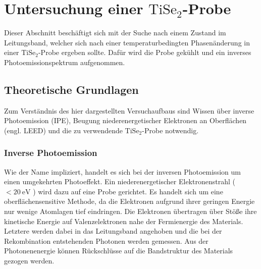\clearpage
\section{\texorpdfstring{Untersuchung einer $\text{TiSe}_2$-Probe}{Untersuchung einer TiSe2-Probe}}
\label{sec:thijs2}

Dieser Abschnitt beschäftigt sich mit der Suche nach einem Zustand im Leitungsband, welcher sich nach einer temperaturbedingten Phasenänderung in einer $\text{TiSe}_2$-Probe ergeben sollte.
Dafür wird die Probe gekühlt und ein inverses Photoemissionspektrum aufgenommen.

\subsection{Theoretische Grundlagen}
\label{sec:theo1}

Zum Verständnis des hier dargestellten Versuchaufbaus sind Wissen über inverse Photoemission (IPE), Beugung niederenergetischer Elektronen an Oberflächen (engl. LEED) und die zu verwendende $\text{TiSe}_2$-Probe notwendig.

\subsubsection{Inverse Photoemission}

Wie der Name impliziert, handelt es sich bei der inversen Photoemission um einen umgekehrten Photoeffekt.
Ein niederenergetischer Elektronenstrahl ($<\SI{20}{\electronvolt}$ \cite{wiki_ipe}) wird dazu auf eine Probe gerichtet.
Es handelt sich um eine oberflächensensitive Methode, da die Elektronen aufgrund ihrer geringen Energie nur wenige Atomlagen tief eindringen.
Die Elektronen übertragen über Stöße ihre kinetische Energie auf Valenzelektronen nahe der Fermienergie des Materials.
Letztere werden dabei in das Leitungsband angehoben und die bei der Rekombination entstehenden Photonen werden gemessen.
Aus der Photonenenergie können Rückschlüsse auf die Bandstruktur des Materials gezogen werden.

